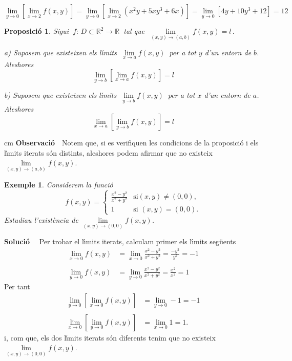 \documentclass[12pt]{article}
\newcommand{\observacio}{\textbf{Observaci{\'o}}\ \ }
\newcommand{\solucio}{\textbf{Soluci{\'o}}\ \ }
\newtheorem{proposicio}{Proposici{\'o}}[subsection]
\newtheorem{exemple}{Exemple}[subsection]
\newcommand{\R}{\mathbb{R}}
\begin{document}
$$
\lim_{y\to 0}\left[\lim_{x\to 2}  f(x,y)\right]=\lim_{y\to 0}\left[\lim_{x\to 2}  (x^2y+5x y^3+6x)\right]=\lim_{y\to 0}\left[4y+10y^3+12\right]=12
$$

\vspace{0.4cm}
\begin{proposicio}
Sigui $\ f:\, D\subset \R^2 \longrightarrow \R\ $ tal que
$\ \lim\limits_{(x,y)\to (a,b)} f(x,y)=l\,. $

a) Suposem  que existeixen
els l{\'\i}mits $\ \lim\limits_{x\to a} f(x,y)\ $ per a tot $y$ d'un entorn de $b$.
Aleshores
\[
\lim_{y\to b}\left[ \lim_{x\to a} f(x,y) \right]= l
\]

b) Suposem  que existeixen
els l{\'\i}mits $\ \lim\limits_{y\to b} f(x,y)\ $ per a tot $x$ d'un entorn de $a$.
Aleshores
\[
\lim_{x\to a}\left[ \lim_{y\to b} f(x,y)\right]= l
\]
\end{proposicio}


 cm
\observacio Notem que, si es verifiquen les condicions de la proposici{\'o} i els l{\'\i}mits iterats s{\'o}n distints, aleshores podem afirmar que
no existeix $\lim\limits_{(x,y)\to (a,b)} f(x,y)$.

\vspace{0.4cm}
\begin{exemple}
Considerem la funci{\'o}
\[
f(x,y)=\begin{cases} \frac{x^2- y^2}{x^2+y^2} & \text{si
$(x,y)\not= (0,0)$},\\ 1 & \text{si $(x,y)=(0,0)$.}
\end{cases}
\]
Estudiau l'exist{\`e}ncia de $\lim\limits_{(x,y)\to (0,0)} f(x,y)$.
\end{exemple}

\solucio
Per trobar el l{\'\i}mits iterats, calculam primer els l{\'\i}mits seg{\"u}ents
\begin{align*}
\lim_{x\to 0} f(x,y)&=\lim_{x\to 0} \frac{x^2 -y^2}{x^2+y^2} =
\frac{-y^2}{y^2} = -1 \\
&\\
 \lim_{y\to 0} f(x,y)&=\lim_{y\to 0}
\frac{x^2 -y^2}{x^2+y^2} = \frac{x^2}{x^2} = 1
\end{align*}
Per tant
\begin{align*}
\lim_{y\to 0}\left[\lim_{x\to 0} f(x,y)\right]&=\lim_{y\to 0} -1= -1 \\
 &\\
 \lim_{x\to 0}\left[\lim_{y\to 0}f(x,y)\right]&=\lim_{x\to 0} 1= 1.
\end{align*}
i, com que, els dos l{\'\i}mits iterats s{\'o}n diferents tenim que
no existeix $\lim\limits_{(x,y)\to (0,0)} f(x,y)$.
\end{document}
